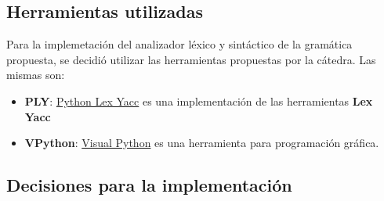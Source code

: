 \subsection{Herramientas utilizadas}

Para la implemetaci\'on del analizador l\'exico y sint\'actico de la gram\'atica propuesta, se decidi\'o utilizar las herramientas propuestas por la c\'atedra. Las mismas son:

\begin{itemize}

\item [] \textbf{PLY}: \href{http://www.dabeaz.com/ply/}{Python Lex Yacc} es una implementaci\'on de las herramientas \textbf{Lex} \textbf{Yacc}

\item [] \textbf{VPython}: \href{http://vpython.org/index.html}{Visual Python} es una herramienta para programaci\'on gr\'afica.

\end{itemize}

\subsection{Decisiones para la implementaci\'on}

